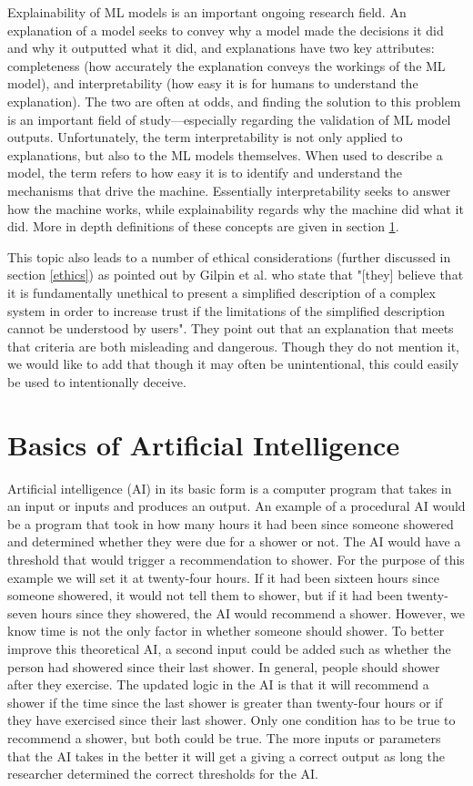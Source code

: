 \documentclass[]{article}
\begin{document}
		Explainability of ML models is an important ongoing research field. An explanation of a model seeks to convey why a model made the decisions it did and why it outputted what it did, and explanations have two key attributes: completeness (how accurately the explanation conveys the workings of the ML model), and interpretability (how easy it is for humans to understand the explanation). The two are often at odds, and finding the solution to this problem is an important field of study\cite{8631448}---especially regarding the validation of ML model outputs.\cite{10.1145/3328519.3329126} Unfortunately, the term interpretability is not only applied to explanations, but also to the ML models themselves. When used to describe a model, the term refers to how easy it is to identify and understand the mechanisms that drive the machine. Essentially interpretability seeks to answer how the machine works, while explainability regards why the machine did what it did.\cite{8631448} More in depth definitions of these concepts are given in section \ref{introtoai}.

		This topic also leads to a number of ethical considerations (further discussed in section \ref{ethics}) as pointed out by Gilpin et al. who state that "[they] believe that it is fundamentally unethical to present a simplified description of a complex system in order to increase trust if the limitations of the simplified description cannot be understood by users". They point out that an explanation that meets that criteria are both misleading and dangerous.\cite{8631448} Though they do not mention it, we would like to add that though it may often be unintentional, this could easily be used to intentionally deceive. 
		
	\section{Basics of Artificial Intelligence}\label{introtoai}
		Artificial intelligence (AI) in its basic form is a computer program that takes in an input or inputs and produces an output. An example of a procedural AI would be a program that took in how many hours it had been since someone showered and determined whether they were due for a shower or not. The AI would have a threshold that would trigger a recommendation to shower. For the purpose of this example we will set it at twenty-four hours. If it had been sixteen hours since someone showered, it would not tell them to shower, but if it had been twenty-seven hours since they showered, the AI would recommend a shower. However, we know time is not the only factor in whether someone should shower. To better improve this theoretical AI, a second input could be added such as whether the person had showered since their last shower. In general, people should shower after they exercise. The updated logic in the AI is that it will recommend a shower if the time since the last shower is greater than twenty-four hours or if they have exercised since their last shower. Only one condition has to be true to recommend a shower, but both could be true. The more inputs or parameters that the AI takes in the better it will get a giving a correct output as long the researcher determined the correct thresholds for the AI.
\end{document}
